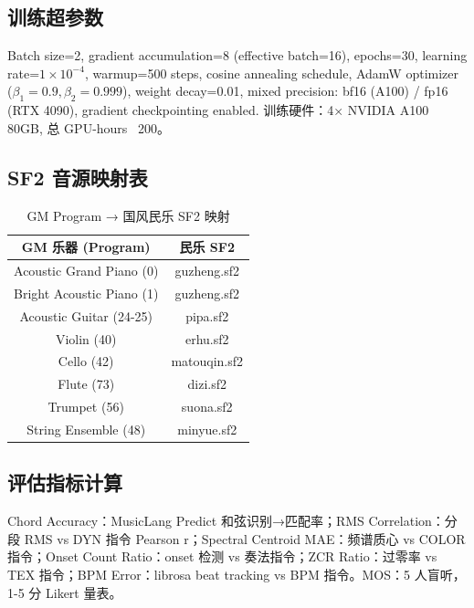 \documentclass[11pt,twocolumn]{article}
\begin{document}
\subsection{训练超参数}
Batch size=2, gradient accumulation=8 (effective batch=16), epochs=30, learning rate=$1\times10^{-4}$, warmup=500 steps, cosine annealing schedule, AdamW optimizer ($\beta_1=0.9,\beta_2=0.999$), weight decay=0.01, mixed precision: bf16 (A100) / fp16 (RTX 4090), gradient checkpointing enabled. 训练硬件：4× NVIDIA A100 80GB, 总 GPU-hours ~200。

\subsection{SF2 音源映射表}
\begin{table}[H]
\centering\footnotesize
\caption{GM Program → 国风民乐 SF2 映射}
\begin{tabular}{c|c}
\toprule
GM 乐器 (Program) & 民乐 SF2 \\
\midrule
Acoustic Grand Piano (0) & guzheng.sf2 \\
Bright Acoustic Piano (1) & guzheng.sf2 \\
Acoustic Guitar (24-25) & pipa.sf2 \\
Violin (40) & erhu.sf2 \\
Cello (42) & matouqin.sf2 \\
Flute (73) & dizi.sf2 \\
Trumpet (56) & suona.sf2 \\
String Ensemble (48) & minyue.sf2 \\
\bottomrule
\end{tabular}
\end{table}

\subsection{评估指标计算}
Chord Accuracy：MusicLang Predict 和弦识别→匹配率；RMS Correlation：分段 RMS vs DYN 指令 Pearson r；Spectral Centroid MAE：频谱质心 vs COLOR 指令；Onset Count Ratio：onset 检测 vs 奏法指令；ZCR Ratio：过零率 vs TEX 指令；BPM Error：librosa beat tracking vs BPM 指令。MOS：5 人盲听，1-5 分 Likert 量表。
\end{document}
